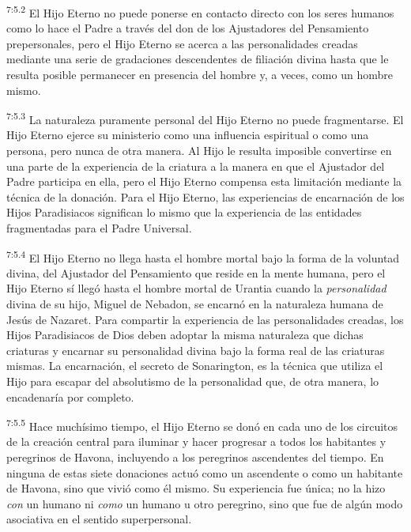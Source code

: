 \par
\textsuperscript{7:5.2} El Hijo Eterno no puede ponerse en contacto directo con los seres humanos como lo hace el Padre a través del don de los Ajustadores del Pensamiento prepersonales, pero el Hijo Eterno se acerca a las personalidades creadas mediante una serie de gradaciones descendentes de filiación divina hasta que le resulta posible permanecer en presencia del hombre y, a veces, como un hombre mismo.

\par
\textsuperscript{7:5.3} La naturaleza puramente personal del Hijo Eterno no puede fragmentarse. El Hijo Eterno ejerce su ministerio como una influencia espiritual o como una persona, pero nunca de otra manera. Al Hijo le resulta imposible convertirse en una parte de la experiencia de la criatura a la manera en que el Ajustador del Padre participa en ella, pero el Hijo Eterno compensa esta limitación mediante la técnica de la donación. Para el Hijo Eterno, las experiencias de encarnación de los Hijos Paradisiacos significan lo mismo que la experiencia de las entidades fragmentadas para el Padre Universal.

\par
\textsuperscript{7:5.4} El Hijo Eterno no llega hasta el hombre mortal bajo la forma de la voluntad divina, del Ajustador del Pensamiento que reside en la mente humana, pero el Hijo Eterno sí llegó hasta el hombre mortal de Urantia cuando la \textit{personalidad} divina de su hijo, Miguel de Nebadon, se encarnó en la naturaleza humana de Jesús de Nazaret. Para compartir la experiencia de las personalidades creadas, los Hijos Paradisiacos de Dios deben adoptar la misma naturaleza que dichas criaturas y encarnar su personalidad divina bajo la forma real de las criaturas mismas. La encarnación, el secreto de Sonarington, es la técnica que utiliza el Hijo para escapar del absolutismo de la personalidad que, de otra manera, lo encadenaría por completo.

\par
\textsuperscript{7:5.5} Hace muchísimo tiempo, el Hijo Eterno se donó en cada uno de los circuitos de la creación central para iluminar y hacer progresar a todos los habitantes y peregrinos de Havona, incluyendo a los peregrinos ascendentes del tiempo. En ninguna de estas siete donaciones actuó como un ascendente o como un habitante de Havona, sino que vivió como él mismo. Su experiencia fue única; no la hizo \textit{con} un humano ni \textit{como} un humano u otro peregrino, sino que fue de algún modo asociativa en el sentido superpersonal.

